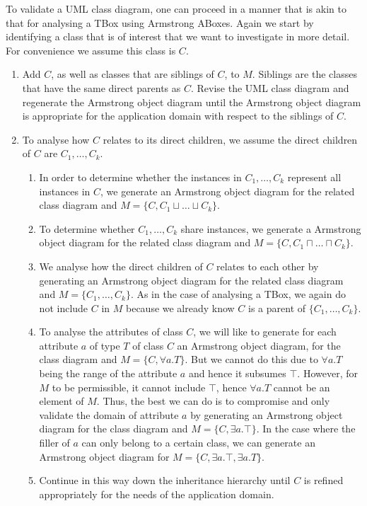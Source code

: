 \documentclass{amsart}
\begin{document}
   
    To validate a UML class diagram, one can proceed in a manner that is akin to that for analysing a TBox using Armstrong ABoxes.      
    Again we start by identifying a class that is of interest that we want to investigate in more detail. For convenience we assume this class is $C$.
    \begin{enumerate}
    \item Add $C$, as well as classes that are siblings of $C$, to $M$. Siblings are the classes that have the same direct parents as $C$. Revise the UML class diagram and regenerate the Armstrong object diagram until the Armstrong object diagram is appropriate for the application domain with respect to the siblings of $C$.
    \item To analyse how $C$ relates to its direct children,  we assume the direct children of $C$ are $C_1, \ldots, C_k$.
    \begin{enumerate}
     \item \label{enum_cover} In order to determine whether the instances in $C_1, \ldots, C_k$ represent all instances in $C$, we generate an Armstrong object diagram for the related class diagram and $M = \{C, C_1 \sqcup \ldots \sqcup C_k\}$. 
     \item \label{enum_intersect} To determine whether $C_1, \ldots, C_k$ share instances, we generate a Armstrong object diagram for the related class diagram and $M = \{C, C_1 \sqcap \ldots \sqcap C_k\}$.
     \item \label{enum_subsumee_relation}We analyse how the direct children of $C$ relates to each other by generating an Armstrong object diagram for the related class diagram and $M = \{C_1, \ldots, C_k\}$. As in the case of analysing a TBox, we again do not include $C$ in $M$ because we already know $C$ is a parent of $\{C_1, \ldots, C_k\}$. 
     \item To analyse the attributes of class $C$, we will like to generate for each attribute $a$ of type $T$ of class $C$ an Armstrong object diagram, for the class diagram and $M = \{C, \forall a.T\}$. But we cannot do this due to $\forall a.T$ being the range of the attribute $a$ and hence it subsumes $\top$. However, for $M$ to be permissible, it cannot include $\top$, hence $\forall a.T$ cannot be an element of $M$. Thus, the best we can do is to compromise and only validate the domain of attribute $a$ by generating an Armstrong object diagram for the class diagram and $M = \{C, \exists a.\top\}$. In the case where the filler of $a$ can only belong to a certain class, we can generate an Armstrong object diagram for $M = \{C, \exists a.\top, \exists a.T\}$.
     \item Continue in this way down the inheritance hierarchy until $C$ is refined appropriately for the needs of the application domain.
    \end{enumerate}    
    \end{enumerate}
       
\end{document}
